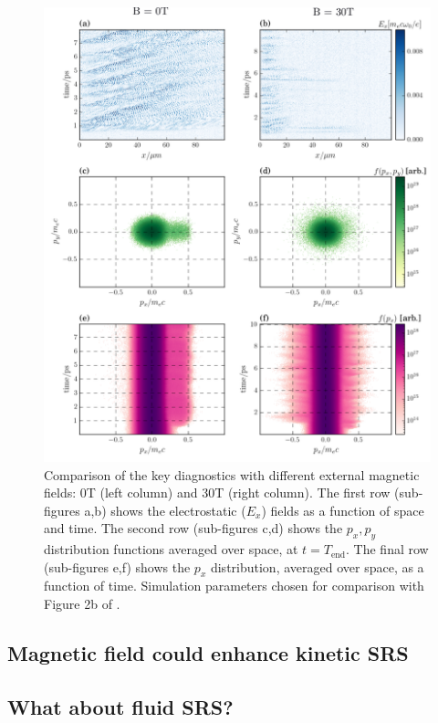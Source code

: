 \begin{figure}[ht]
   \centering
    \includegraphics[width=\columnwidth]{Chapters/C6_magSRS/Winjum_rep_megaPlot_label.pdf}
    \caption{Comparison of the key diagnostics with different external magnetic fields: 0T (left column) and 30T (right column). The first row (sub-figures a,b) shows the electrostatic ($E_x$) fields as a function of space and time. The second row (sub-figures c,d) shows the $p_x,p_y$ distribution functions averaged over space, at $t=T_{\mathrm{end}}$. The final row (sub-figures e,f) shows the $p_x$ distribution, averaged over space, as a function of time. Simulation parameters chosen for comparison with Figure 2b of \citet{Winjum2018}.}
    \label{fig:WinjumRep}
\end{figure}{}




\subsection{Magnetic field could enhance kinetic SRS}

\subsection{What about fluid SRS?}

